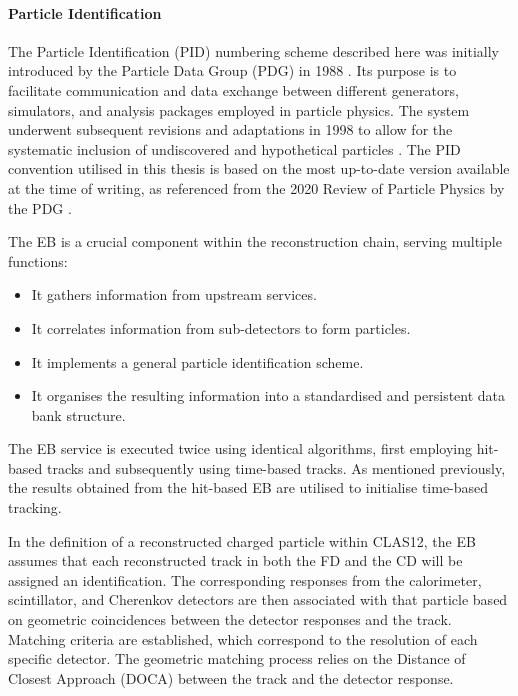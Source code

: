\paragraph{Particle Identification}
    The Particle Identification (PID) numbering scheme described here was initially introduced by the Particle Data Group (PDG) in 1988 \cite{yost1988}.
    Its purpose is to facilitate communication and data exchange between different generators, simulators, and analysis packages employed in particle physics.
    The system underwent subsequent revisions and adaptations in 1998 to allow for the systematic inclusion of undiscovered and hypothetical particles \cite{particle1998}.
    The PID convention utilised in this thesis is based on the most up-to-date version available at the time of writing, as referenced from the 2020 Review of Particle Physics by the PDG \cite{particle2020}.

    The EB is a crucial component within the reconstruction chain, serving multiple functions:
    \begin{itemize}
        \item
            It gathers information from upstream services.
        \item
            It correlates information from sub-detectors to form particles.
        \item
            It implements a general particle identification scheme.
        \item
            It organises the resulting information into a standardised and persistent data bank structure.
    \end{itemize}

    The EB service is executed twice using identical algorithms, first employing hit-based tracks and subsequently using time-based tracks.
    As mentioned previously, the results obtained from the hit-based EB are utilised to initialise time-based tracking.

    In the definition of a reconstructed charged particle within CLAS12, the EB assumes that each reconstructed track in both the FD and the CD will be assigned an identification.
    The corresponding responses from the calorimeter, scintillator, and Cherenkov detectors are then associated with that particle based on geometric coincidences between the detector responses and the track.
    Matching criteria are established, which correspond to the resolution of each specific detector.
    The geometric matching process relies on the Distance of Closest Approach (DOCA) between the track and the detector response.

